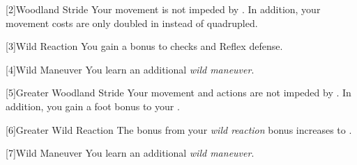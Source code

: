         [2]{Woodland Stride} Your movement is not impeded by .
        In addition, your movement costs are only doubled in  instead of quadrupled.

        [3]{Wild Reaction} You gain a  bonus to  checks and Reflex defense.

        [4]{Wild Maneuver}
        You learn an additional \textit{wild maneuver}.

        [5]{Greater Woodland Stride} Your movement and actions are not impeded by .
        In addition, you gain a  foot bonus to your .

        [6]{Greater Wild Reaction} The bonus from your \textit{wild reaction} bonus increases to .

        [7]{Wild Maneuver}
        You learn an additional \textit{wild maneuver}.




\newpage
